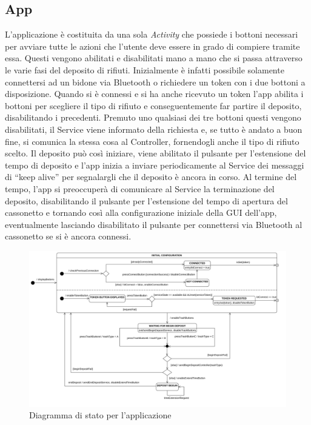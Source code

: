 \documentclass[a4paper, 12pt]{report}
\begin{document}
			\subsection{App}
			L'applicazione è costituita da una sola \emph{Activity} che possiede i bottoni necessari per
			avviare tutte le azioni che l'utente deve essere in grado di compiere tramite essa. Questi vengono abilitati e
			disabilitati mano a mano che si passa attraverso le varie fasi del deposito di rifiuti.
			Inizialmente è infatti possibile solamente connettersi ad un bidone via Bluetooth o
			richiedere un token con i due bottoni a disposizione. Quando si è connessi e si ha anche
			ricevuto un token l'app abilita i bottoni per scegliere il tipo di rifiuto e
			conseguentemente far partire il deposito, disabilitando i precedenti. Premuto uno qualsiasi
			dei tre bottoni questi vengono disabilitati, il Service viene informato della
			richiesta e, se tutto è andato a buon fine, si comunica la stessa cosa al Controller,
			fornendogli anche il tipo di rifiuto scelto. Il deposito può così iniziare, viene  
			abilitato il pulsante per l'estensione del tempo di deposito e l'app inizia a inviare periodicamente 
			al Service dei messaggi di ``keep alive'' per segnalargli che il deposito è ancora in corso. Al termine del tempo, l'app 
			si preoccuperà di comunicare al Service la terminazione del deposito, disabilitando il pulsante 
			per l'estensione del tempo di apertura del cassonetto e tornando così alla configurazione iniziale 
			della GUI dell'app, eventualmente lasciando disabilitato il pulsante per connettersi via Bluetooth 
			al cassonetto se si è ancora connessi.
			\begin{figure}[H]
				\centering
				\includegraphics[width=1.03\textwidth]{"img/AppStatechart"}    
				\caption{Diagramma di stato per l'applicazione}
			\end{figure}
\end{document}
